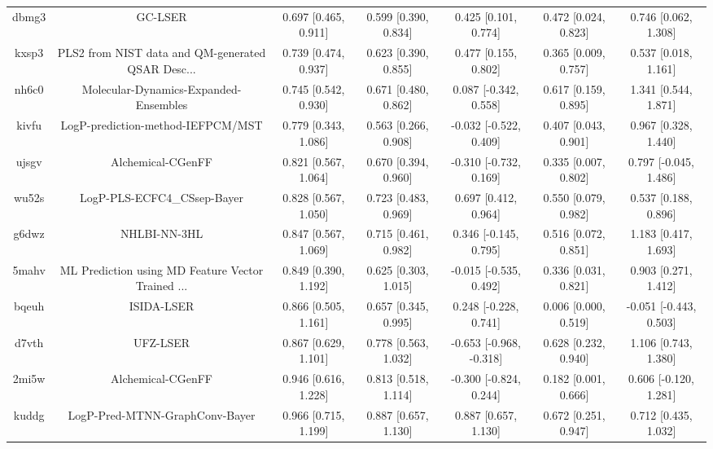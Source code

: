 \documentclass{article}
\begin{document}
\begin{center}
\begin{longtable}{|ccccccc|}
 dbmg3 &                                            GC-LSER &  0.697 [0.465, 0.911] &  0.599 [0.390, 0.834] &     0.425 [0.101, 0.774] &  0.472 [0.024, 0.823] &    0.746 [0.062, 1.308] \\
 kxsp3 &  PLS2 from NIST data and QM-generated QSAR Desc... &  0.739 [0.474, 0.937] &  0.623 [0.390, 0.855] &     0.477 [0.155, 0.802] &  0.365 [0.009, 0.757] &    0.537 [0.018, 1.161] \\
 nh6c0 &              Molecular-Dynamics-Expanded-Ensembles &  0.745 [0.542, 0.930] &  0.671 [0.480, 0.862] &    0.087 [-0.342, 0.558] &  0.617 [0.159, 0.895] &    1.341 [0.544, 1.871] \\
 kivfu &                  LogP-prediction-method-IEFPCM/MST &  0.779 [0.343, 1.086] &  0.563 [0.266, 0.908] &   -0.032 [-0.522, 0.409] &  0.407 [0.043, 0.901] &    0.967 [0.328, 1.440] \\
 ujsgv &                                  Alchemical-CGenFF &  0.821 [0.567, 1.064] &  0.670 [0.394, 0.960] &   -0.310 [-0.732, 0.169] &  0.335 [0.007, 0.802] &   0.797 [-0.045, 1.486] \\
 wu52s &                        LogP-PLS-ECFC4\_CSsep-Bayer &  0.828 [0.567, 1.050] &  0.723 [0.483, 0.969] &     0.697 [0.412, 0.964] &  0.550 [0.079, 0.982] &    0.537 [0.188, 0.896] \\
 g6dwz &                                       NHLBI-NN-3HL &  0.847 [0.567, 1.069] &  0.715 [0.461, 0.982] &    0.346 [-0.145, 0.795] &  0.516 [0.072, 0.851] &    1.183 [0.417, 1.693] \\
 5mahv &  ML Prediction using MD Feature Vector Trained ... &  0.849 [0.390, 1.192] &  0.625 [0.303, 1.015] &   -0.015 [-0.535, 0.492] &  0.336 [0.031, 0.821] &    0.903 [0.271, 1.412] \\
 bqeuh &                                         ISIDA-LSER &  0.866 [0.505, 1.161] &  0.657 [0.345, 0.995] &    0.248 [-0.228, 0.741] &  0.006 [0.000, 0.519] &  -0.051 [-0.443, 0.503] \\
 d7vth &                                           UFZ-LSER &  0.867 [0.629, 1.101] &  0.778 [0.563, 1.032] &  -0.653 [-0.968, -0.318] &  0.628 [0.232, 0.940] &    1.106 [0.743, 1.380] \\
 2mi5w &                                  Alchemical-CGenFF &  0.946 [0.616, 1.228] &  0.813 [0.518, 1.114] &   -0.300 [-0.824, 0.244] &  0.182 [0.001, 0.666] &   0.606 [-0.120, 1.281] \\
 kuddg &                     LogP-Pred-MTNN-GraphConv-Bayer &  0.966 [0.715, 1.199] &  0.887 [0.657, 1.130] &     0.887 [0.657, 1.130] &  0.672 [0.251, 0.947] &    0.712 [0.435, 1.032] \\

\end{longtable}
\end{center}
\end{document}
